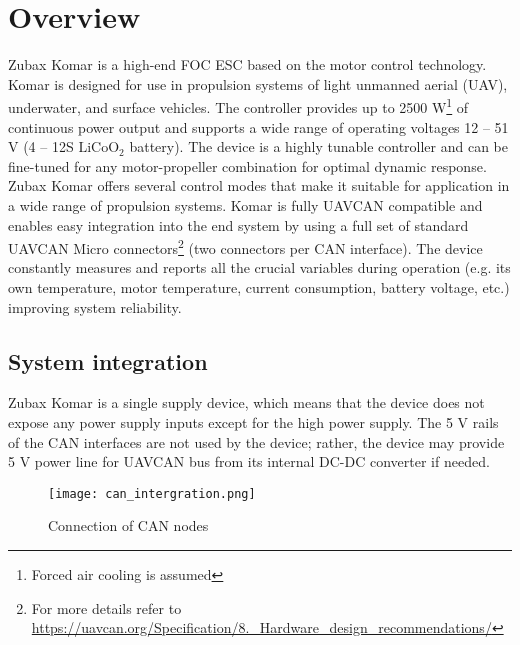 \chapter{Overview}

Zubax Komar is a high-end FOC ESC based on the  motor control technology.
Komar is designed for use in propulsion systems of light unmanned aerial (UAV), underwater, and surface vehicles.
The controller provides up to 2500 W\footnote{Forced air cooling is assumed}
of continuous power output and supports a wide range of operating voltages
12 -- 51 V (4 -- 12S $\text{LiCoO}_\text{2}$ battery).
The device is a highly tunable controller and can be fine-tuned for any motor-propeller combination
for optimal dynamic response.
Zubax Komar offers several control modes that make it suitable for application in a wide range of propulsion systems.
Komar is fully UAVCAN compatible and enables easy integration into the end system by using a full set
of standard UAVCAN Micro connectors\footnote{For more details refer to
\url{https://uavcan.org/Specification/8._Hardware_design_recommendations/}} (two connectors per CAN interface).
The device constantly measures and reports all the crucial variables during operation
(e.g. its own temperature, motor temperature, current consumption, battery voltage, etc.)
improving system reliability.

\section{System integration}
Zubax Komar is a single supply device, which means that the device does not expose any power supply inputs except
for the high power supply. The 5 V rails of the CAN interfaces are not used by the device;
rather, the device may provide 5 V power line for UAVCAN bus from its internal DC-DC converter if needed.

\begin{figure}[h]
    \centering
    \texttt{[image: can\_intergration.png]}
    \caption{Connection of CAN nodes}
\end{figure}
